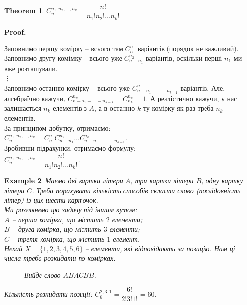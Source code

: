 \documentclass[a4paper, 14pt]{extarticle}
\makeatletter
\theoremstyle{theoremdd}
\newtheorem{theorem}{Theorem}[subsection]
\theoremstyle{theoremdd}
\theoremstyle{theoremdd}
\theoremstyle{theoremdd}
\theoremstyle{theoremdd}
\newtheorem{example}[theorem]{Example}
\theoremstyle{theoremdd}
\theoremstyle{theoremdd}
\theoremstyle{theoremdd}
\theoremstyle{theoremdd}
\theoremstyle{theoremdd}
\theoremstyle{theoremdd}
\theoremstyle{theoremdd}
\theoremstyle{theoremdd}
\theoremstyle{theoremdd}
\theoremstyle{theoremdd}
\renewenvironment{proof}[1][Proof.\\]{\par
\pushQED{\hfill \qed}%
\normalfont \topsep6\p@\@plus6\p@\relax
\trivlist
\item\relax
{\bfseries
#1\@addpunct{.}}\hspace\labelsep\ignorespaces
}{%
\popQED\endtrivlist\@endpefalse
}
\makeatother
\begin{document}
\begin{theorem}
$C_n^{n_1,n_2,\dots,n_k} = \dfrac{n!}{n_1! n_2! \dots n_k!}$
\end{theorem}

\begin{proof}
Заповнимо першу комірку -- всього там $C_n^{n_1}$ варіантів (порядок не важливий).\\
Заповнимо другу комімку -- всього уже $C_{n-n_1}^{n_2}$ варіантів, оскільки перші $n_1$ ми вже розташували.\\
\vdots \\
Заповнимо останню комірку -- всього уже $C_{n-n_1-\dots-n_{k-1}}^n$ варіантів. Але, алгебраїчно кажучи, $C_{n-n_1-\dots-n_{k-1}}^{n_k} = C_{n_k}^{n_k} = 1$. А реалістично кажучи, у нас залишається $n_k$ елементів з $A$, а в останню $k$-ту комірку як раз треба $n_k$ елементів.\\
За принципом добутку, отримаємо:\\
$C_n^{n_1,n_2,\dots,n_k} = C_n^{n_1} C_{n-n_1}^{n_2} \dots C_{n-n_1-\dots-n_{k-1}}^{n_k}$.\\
Зробивши підрахунки, отримаємо формулу:\\
$C_n^{n_1,n_2,\dots,n_k} = \dfrac{n!}{n_1! n_2! \dots n_k!}$.
\end{proof}

\begin{example}
Маємо дві картки літери $A$, три картки літери $B$, одну картку літери $C$. Треба порахувати кількість способів скласти слово (послідовність літер) із цих шести карточок.\\
Ми розглянемо цю задачу під іншим кутом: \\
$A$ -- перша комірка, що містить $2$ елементи;\\
$B$ -- друга комірка, що містить $3$ елементи;\\
$C$ -- третя комірка, що містить $1$ елемент.\\
Нехай $X = \{1,2,3,4,5,6\}$ -- елементи, які відповідають за позицію. Нам ці числа треба розкидати по комірках.
\begin{figure}[H]
\centering
{}
\caption*{Вийде слово $ABACBB$.}
\end{figure}
Кількість розкидати позиції: $C_6^{2,3,1} = \dfrac{6!}{2! 3! 1!} = 60$.
\end{example}
\end{document}
